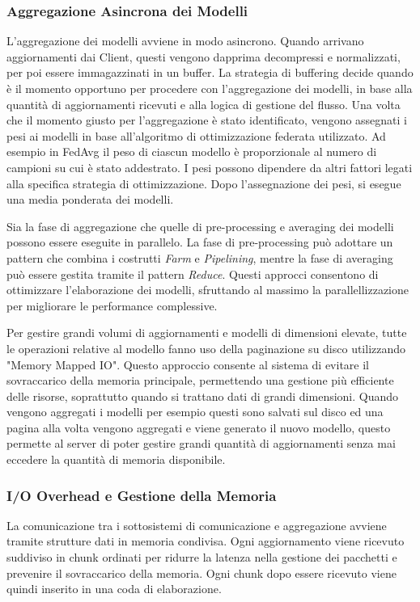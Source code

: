 \documentclass[a4paper, oneside, openright]{report}
\begin{document}
\subsubsection*{Aggregazione Asincrona dei Modelli}
L'aggregazione dei modelli avviene in modo asincrono. Quando arrivano aggiornamenti dai Client, questi vengono dapprima decompressi e normalizzati, per poi essere immagazzinati in un buffer. La strategia di buffering decide quando è il momento opportuno per procedere con l'aggregazione dei modelli, in base alla quantità di aggiornamenti ricevuti e alla logica di gestione del flusso. Una volta che il momento giusto per l'aggregazione è stato identificato, vengono assegnati i pesi ai modelli in base all'algoritmo di ottimizzazione federata utilizzato. Ad esempio in FedAvg il peso di ciascun modello è proporzionale al numero di campioni su cui è stato addestrato. I pesi possono dipendere da altri fattori legati alla specifica strategia di ottimizzazione. Dopo l'assegnazione dei pesi, si esegue una media ponderata dei modelli.

Sia la fase di aggregazione che quelle di pre-processing e averaging dei modelli possono essere eseguite in parallelo. La fase di pre-processing può adottare un pattern che combina i costrutti \textit{Farm} e \textit{Pipelining}, mentre la fase di averaging può essere gestita tramite il pattern \textit{Reduce}. Questi approcci consentono di ottimizzare l’elaborazione dei modelli, sfruttando al massimo la parallellizzazione per migliorare le performance complessive.

Per gestire grandi volumi di aggiornamenti e modelli di dimensioni elevate, tutte le operazioni relative al modello fanno uso della paginazione su disco utilizzando "Memory Mapped IO". Questo approccio consente al sistema di evitare il sovraccarico della memoria principale, permettendo una gestione più efficiente delle risorse, soprattutto quando si trattano dati di grandi dimensioni. Quando vengono aggregati i modelli per esempio questi sono salvati sul disco ed una pagina alla volta vengono aggregati e viene generato il nuovo modello, questo permette al server di poter gestire grandi quantità di aggiornamenti senza mai eccedere la quantità di memoria disponibile.

\subsubsection*{I/O Overhead e Gestione della Memoria}
La comunicazione tra i sottosistemi di comunicazione e aggregazione avviene tramite strutture dati in memoria condivisa. Ogni aggiornamento viene ricevuto suddiviso in chunk ordinati per ridurre la latenza nella gestione dei pacchetti e prevenire il sovraccarico della memoria. Ogni chunk dopo essere ricevuto viene quindi inserito in una coda di elaborazione.
\end{document}
